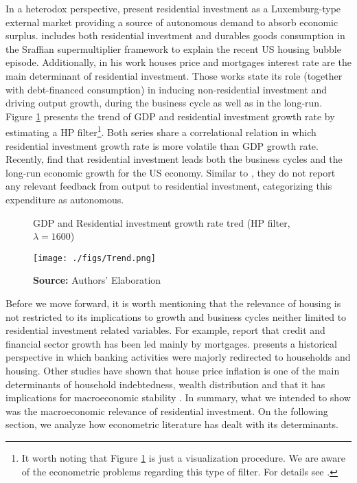 \documentclass[12pt, a4paper]{article}
\begin{document}
In a heterodox perspective, \textcites{fiebiger_semi-autonomous_2018}{fiebiger_trend_2017} present residential investment as a Luxemburg-type external market providing a source of autonomous demand to absorb economic surplus.
\textcite{teixeira_crescimento_2015} includes both residential investment  and durables goods consumption in the Sraffian supermultiplier framework to explain the recent US housing bubble episode.
Additionally, in his work houses price and mortgages interest rate are the main determinant of residential investment.
Those works state its role (together with debt-financed consumption) in inducing non-residential investment and driving output growth, during the business cycle as well as in the long-run.
Figure \ref{fig:trend} presents the trend of GDP and residential investment growth rate by estimating a HP filter\footnote{It worth noting that Figure \ref{fig:trend} is just a visualization procedure. We are aware of the econometric problems regarding this type of filter. For details see \textcite{NBER_HP}.}.
Both series share a correlational relation in which residential investment growth rate is more volatile than GDP growth rate.
Recently, \textcite{perez_Montiel_2021} find that residential investment leads both the business cycles and the long-run economic growth for the US economy.
Similar to \textcite{girardi_long-run_2016}, they do not report any relevant feedback from output to residential investment, categorizing this expenditure as autonomous.

\begin{figure}[H]
	\centering
	\caption{GDP and Residential investment growth rate tred (HP filter, $\lambda = 1600$)}
	\label{fig:trend}
	\texttt{[image: ./figs/Trend.png]}
	\caption*{\textbf{Source:} Authors' Elaboration}
\end{figure}


Before we move forward, it is worth mentioning that the relevance of housing is not restricted to its implications to growth and business cycles neither limited to residential investment related variables.
For example, \textcite{jorda_great_2016} report that credit and financial sector growth has been led mainly by mortgages. 
\textcite{kohl_more_2018} presents a historical perspective in which banking activities were majorly redirected to households and housing.
Other studies have shown that house price inflation is one of the main determinants of household indebtedness, wealth distribution and that it has implications for macroeconomic stability \cites{stockhammer_debt-driven_2016}{johnston_global_2017}{mian_household_2017}{fuller_housing_2020}.
In summary, what we intended to show was the macroeconomic relevance of residential investment.
On the following section, we analyze how econometric literature has dealt with its determinants.
\end{document}
